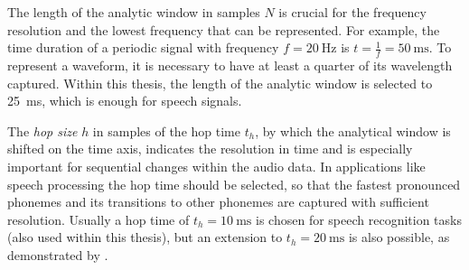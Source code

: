 The length of the analytic window in samples $N$ is crucial for the frequency resolution and the lowest frequency that can be represented.
For example, the time duration of a periodic signal with frequency $f=\SI{20}{\hertz}$ is $t=\frac{1}{f} = \SI{50}{\milli\second}$.
To represent a waveform, it is necessary to have at least a quarter of its wavelength captured.
Within this thesis, the length of the analytic window is selected to \SI{25}{\milli\second}, which is enough for speech signals.

The \emph{hop size} $h$ in samples of the hop time $t_h$, by which the analytical window is shifted on the time axis, indicates the resolution in time and is especially important for sequential changes within the audio data.
In applications like speech processing the hop time should be selected, so that the fastest pronounced phonemes and its transitions to other phonemes are captured with sufficient resolution.
Usually a hop time of $t_{h}=\SI{10}{\milli\second}$ is chosen for speech recognition tasks (also used within this thesis), but an extension to $t_{h}=\SI{20}{\milli\second}$ is also possible, as demonstrated by \cite{Peter2020}.


